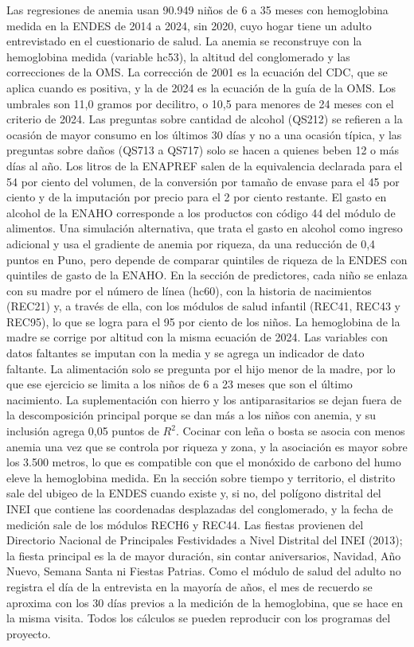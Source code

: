 \documentclass[11pt]{article}
\begin{document}
\small
Las regresiones de anemia usan 90.949 niños de 6 a 35 meses con hemoglobina medida en la ENDES de 2014 a 2024, sin 2020, cuyo hogar tiene un adulto entrevistado en el cuestionario de salud. La anemia se reconstruye con la hemoglobina medida (variable hc53), la altitud del conglomerado y las correcciones de la OMS. La corrección de 2001 es la ecuación del CDC, que se aplica cuando es positiva, y la de 2024 es la ecuación de la guía de la OMS. Los umbrales son 11,0 gramos por decilitro, o 10,5 para menores de 24 meses con el criterio de 2024. Las preguntas sobre cantidad de alcohol (QS212) se refieren a la ocasión de mayor consumo en los últimos 30 días y no a una ocasión típica, y las preguntas sobre daños (QS713 a QS717) solo se hacen a quienes beben 12 o más días al año. Los litros de la ENAPREF salen de la equivalencia declarada para el 54 por ciento del volumen, de la conversión por tamaño de envase para el 45 por ciento y de la imputación por precio para el 2 por ciento restante. El gasto en alcohol de la ENAHO corresponde a los productos con código 44 del módulo de alimentos. Una simulación alternativa, que trata el gasto en alcohol como ingreso adicional y usa el gradiente de anemia por riqueza, da una reducción de 0,4 puntos en Puno, pero depende de comparar quintiles de riqueza de la ENDES con quintiles de gasto de la ENAHO. En la sección de predictores, cada niño se enlaza con su madre por el número de línea (hc60), con la historia de nacimientos (REC21) y, a través de ella, con los módulos de salud infantil (REC41, REC43 y REC95), lo que se logra para el 95 por ciento de los niños. La hemoglobina de la madre se corrige por altitud con la misma ecuación de 2024. Las variables con datos faltantes se imputan con la media y se agrega un indicador de dato faltante. La alimentación solo se pregunta por el hijo menor de la madre, por lo que ese ejercicio se limita a los niños de 6 a 23 meses que son el último nacimiento. La suplementación con hierro y los antiparasitarios se dejan fuera de la descomposición principal porque se dan más a los niños con anemia, y su inclusión agrega 0,05 puntos de $R^2$. Cocinar con leña o bosta se asocia con menos anemia una vez que se controla por riqueza y zona, y la asociación es mayor sobre los 3.500 metros, lo que es compatible con que el monóxido de carbono del humo eleve la hemoglobina medida. En la sección sobre tiempo y territorio, el distrito sale del ubigeo de la ENDES cuando existe y, si no, del polígono distrital del INEI que contiene las coordenadas desplazadas del conglomerado, y la fecha de medición sale de los módulos RECH6 y REC44. Las fiestas provienen del Directorio Nacional de Principales Festividades a Nivel Distrital del INEI (2013); la fiesta principal es la de mayor duración, sin contar aniversarios, Navidad, Año Nuevo, Semana Santa ni Fiestas Patrias. Como el módulo de salud del adulto no registra el día de la entrevista en la mayoría de años, el mes de recuerdo se aproxima con los 30 días previos a la medición de la hemoglobina, que se hace en la misma visita. Todos los cálculos se pueden reproducir con los programas del proyecto.
\end{document}
